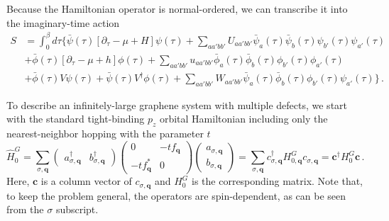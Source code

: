 \documentclass[aps, prb, superscriptaddress, preprint, floatfix]{revtex4-1}
\begin{document}
Because the Hamiltonian operator is normal-ordered, we can transcribe it into the imaginary-time action
%
\begin{align}
	S &= \int_0^\beta d\tau
	\Bigg\{\bar\psi(\tau) \left[\partial_\tau - \mu + H\right]\psi(\tau)
	+ 
	\sum_{aa'bb'}U_{aa'bb'} \bar\psi_a(\tau)\bar\psi_b(\tau)\psi_{b'}(\tau)\psi_{a'}(\tau) 
	\nonumber
	\\
	&+ \bar\phi(\tau)\left[\partial_\tau - \mu + h\right]\phi(\tau)
	 +
	  \sum_{aa'bb'}u_{aa'bb'} \bar\phi_a(\tau)\bar\phi_b(\tau)\phi_{b'}(\tau)\phi_{a'}(\tau) 
	\nonumber
	\\
	&+ \bar\phi(\tau) V \psi(\tau) +  \bar\psi(\tau) V^\dagger \phi(\tau)
	+ 
	\sum_{aa'bb'}W_{aa'bb'} \bar\psi_a(\tau)\bar\phi_b(\tau)\phi_{b'}(\tau)\psi_{a'}(\tau) \Bigg\}\,.
\end{align}
%

To describe an infinitely-large graphene system with multiple defects, we start with the standard tight-binding $p_z$ orbital Hamiltonian including only the nearest-neighbor hopping with the parameter $t$
%
\begin{equation}
	\hat{H}_{0}^G 
	= 
	\sum_{\sigma,\mathbf{q}}
	\begin{pmatrix}
		a^\dagger_{\sigma,\mathbf{q}} & b^\dagger_{\sigma,\mathbf{q}}
	\end{pmatrix} 
	\begin{pmatrix}
       0&-tf_\mathbf{q}
       \\
       -tf_\mathbf{q}^*&0
   \end{pmatrix} 
   \begin{pmatrix}
		a_{\sigma,\mathbf{q}} \\ b_{\sigma,\mathbf{q}}
	\end{pmatrix} 
	= 
	\sum_{\sigma,\mathbf{q}}
	c^\dagger_{\sigma,\mathbf{q}}
	H_{0,\mathbf{q}}^G 
	c_{\sigma,\mathbf{q}} 
	= \mathbf{c}^\dagger H^G_0 \mathbf{c}\,.
	\label{eqn:H0}
\end{equation}
%
Here, $\mathbf{c}$ is a column vector of $c_{\sigma,\mathbf{q}}$ and $H_0^G$ is the corresponding matrix. Note that, to keep the problem general, the operators are spin-dependent, as can be seen from the $\sigma$ subscript.
\end{document}

